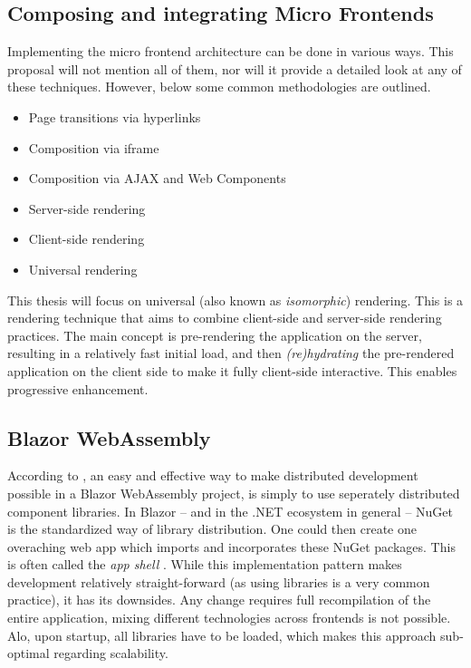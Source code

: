 \subsection{Composing and integrating Micro Frontends}
Implementing the micro frontend architecture can be done in various ways. This
proposal will not mention all of them, nor will it provide a detailed look at
any of these techniques. However, below some common methodologies are outlined.
\autocite{Geers_2020} \autocite{Peltonen_etal_2020} \autocite{Pavlenko_etal_2020}

\begin{itemize}
    \item Page transitions via hyperlinks
    \item Composition via iframe
    \item Composition via AJAX and Web Components
    \item Server-side rendering
    \item Client-side rendering
    \item Universal rendering
\end{itemize}

This thesis will focus on universal (also known as
\textit{isomorphic}) rendering. This is a rendering technique that aims to
combine client-side and server-side rendering practices. The main concept is
pre-rendering the application on the server, resulting in a relatively fast
initial load, and then \textit{(re)hydrating} the pre-rendered application on the
client side to make it fully client-side interactive. This enables progressive
enhancement. \autocite{MillerOsmani_2019}

\subsection{Blazor WebAssembly}
According to \textcite{Rappl_MunichNETMeetup_2020}, an easy and effective way to
make distributed development possible in a Blazor WebAssembly project, is simply
to use seperately distributed component libraries. In Blazor -- and in the .NET
ecosystem in general -- NuGet is the
standardized way of library distribution. One could then create one overaching
web app which imports and incorporates these NuGet packages. This is often
called the \textit{app shell} \textcite{Geers_2020}. While this implementation
pattern makes development relatively straight-forward (as using libraries is a
very common practice), it has its downsides. Any change requires full
recompilation of the entire application, mixing different technologies across
frontends is not possible. Alo, upon startup, all libraries have to be loaded,
which makes this approach sub-optimal regarding scalability.
\autocite{Rappl_MunichNETMeetup_2020}






